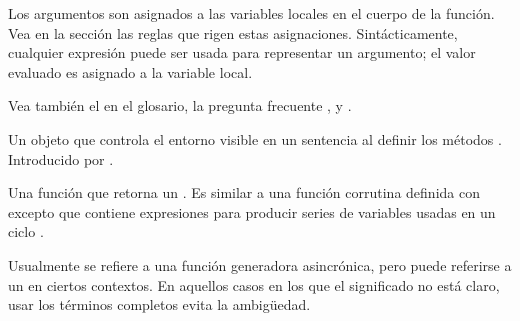 \documentclass[a4,10pt,spanish]{sphinxmanual}
\begin{document}
\begin{description}
\begin{itemize}
\end{itemize}

\sphinxAtStartPar
Los argumentos son asignados a las variables locales en el cuerpo de la función. Vea en la sección  las reglas que rigen estas asignaciones. Sintácticamente, cualquier expresión puede ser usada para representar un argumento; el valor evaluado es asignado a la variable local.

\sphinxAtStartPar
Vea también el {\hyperref[\detokenize{glossary:term-parameter}]{}} en el glosario, la pregunta frecuente , y .

\item[{administrador asincrónico de contexto\index{administrador asincrónico de contexto@\spxentry{administrador asincrónico de contexto}|spxpagem}\phantomsection\label{\detokenize{glossary:term-asynchronous-context-manager}}}] \leavevmode
\sphinxAtStartPar
Un objeto que controla el entorno visible en un sentencia  al definir los métodos  .   Introducido por .

\item[{generador asincrónico\index{generador asincrónico@\spxentry{generador asincrónico}|spxpagem}\phantomsection\label{\detokenize{glossary:term-asynchronous-generator}}}] \leavevmode
\sphinxAtStartPar
Una función que retorna un {\hyperref[\detokenize{glossary:term-asynchronous-generator-iterator}]{}}. Es similar a una función corrutina definida con  excepto que contiene expresiones  para producir series de variables usadas en un ciclo .

\sphinxAtStartPar
Usualmente se refiere a una función generadora asincrónica, pero puede referirse a un  en ciertos contextos. En aquellos casos en los que el significado no está claro, usar los términos completos evita la ambigüedad.


\end{description}
\end{document}
